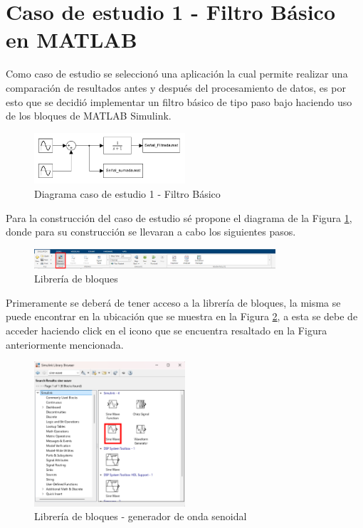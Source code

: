\section{Caso de estudio 1 - Filtro Básico en MATLAB}

Como caso de estudio se seleccionó una aplicación la cual permite realizar una comparación de resultados antes y después del procesamiento de datos, es por esto que se decidió implementar un filtro básico de tipo paso bajo haciendo uso de los bloques de MATLAB Simulink. 

\begin{figure}[h!]
    \centering
    \includegraphics[width=0.5\textwidth]{fig/especifico_2/CASO_ESTUDIO_FILTRO/Diagrama matlab simulink.pdf}
    \caption{Diagrama caso de estudio 1 - Filtro Básico}
    \label{fig:diagrama_matlab_simulink}
\end{figure}

Para la construcción del caso de estudio sé propone el diagrama de la Figura \ref{fig:diagrama_matlab_simulink}, donde para su construcción se llevaran a cabo los siguientes pasos.

\begin{figure}[h!]
    \centering
    \includegraphics[width=0.8\textwidth]{fig/especifico_2/CASO_ESTUDIO_FILTRO/libbroswer_0.pdf}
    \caption{Librería de bloques}
    \label{fig:lib_bloq}
\end{figure}

Primeramente se deberá de tener acceso a la librería de bloques, la misma se puede encontrar en la ubicación que se muestra en la Figura \ref{fig:lib_bloq}, a esta se debe de acceder haciendo click en el icono que se encuentra resaltado en la Figura anteriormente mencionada.
\newpage


\begin{figure}[h!]
    \centering
    \includegraphics[width=0.5\textwidth]{fig/especifico_2/CASO_ESTUDIO_FILTRO/sinewave_0.pdf}
    \caption{Librería de bloques - generador de onda senoidal}
    \label{fig:lib_bloq_sine}
\end{figure}

